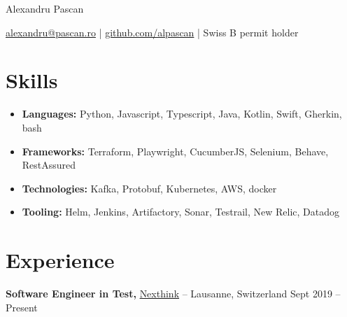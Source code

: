 \documentclass[11pt]{article}       %
\begin{document}
\centerline{\Huge Alexandru Pascan} 

\vspace{5pt}

\centerline{\href{mailto:alexandru@pascan.ro}{alexandru@pascan.ro} | \href{https://github.com/alpascan}{github.com/alpascan} | Swiss B permit holder}


\vspace{-10pt}


\section*{Skills}
\begin{itemize}[leftmargin=*]
    \item \textbf{Languages:} Python, Javascript, Typescript, Java, Kotlin, Swift, Gherkin, bash
    \item \textbf{Frameworks:} Terraform, Playwright, CucumberJS, Selenium, Behave, RestAssured
    \item \textbf{Technologies:} Kafka, Protobuf, Kubernetes, AWS, docker
    \item \textbf{Tooling:} Helm, Jenkins, Artifactory, Sonar, Testrail, New Relic, Datadog
\end{itemize}

\vspace{-18.5pt}


\section*{Experience}

\textbf{Software Engineer in Test,} \href{https://nexthink.com/}{Nexthink} -- Lausanne, Switzerland \hfill Sept 2019 – Present
\vspace{-9pt}
\end{document}

